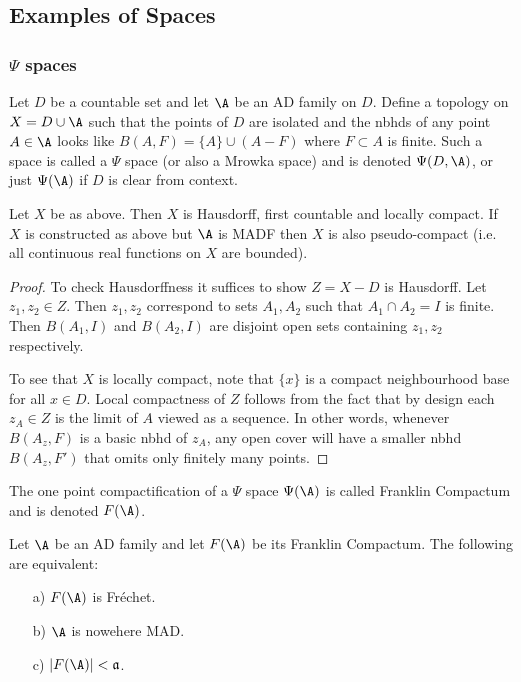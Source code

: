 \documentclass{article}
\begin{document}
\subsection{Examples of Spaces}

\subsubsection{\(\Psi\) spaces}

\begin{defn}
    Let \(D\) be a countable set and let \(\A\) be an AD family on \(D\). Define a topology on \(X = D \cup \A\) such that the points of \(D\) are isolated and the nbhds of any point \(A \in \A\) looks like \(B(A, F) = \{A\} \cup (A - F)\) where \(F \subset A\) is finite. Such a space is called a \(\Psi\) space (or also a Mrowka space) and is denoted \(\Psi(D, \A)\), or just \(\Psi(\A)\) if \(D\) is clear from context.
\end{defn}

\begin{prop}
    Let \(X\) be as above. Then \(X\) is Hausdorff, first countable and locally compact. If \(X\) is constructed as above but \(\A\) is MADF then \(X\) is also pseudo-compact (i.e. all continuous real functions on \(X\) are bounded).
\end{prop}

\begin{proof}
    To check Hausdorffness it suffices to show \(Z = X- D\) is Hausdorff. Let \(z_1, z_2 \in Z\). Then \(z_1, z_2\) correspond to sets \(A_1, A_2\) such that \(A_1 \cap A_2 = I\) is finite. Then \(B(A_1, I)\) and \(B(A_2, I)\) are disjoint open sets containing \(z_1, z_2\) respectively. 

    To see that \(X\) is locally compact, note that \(\{x\}\) is a compact neighbourhood base for all \(x \in D\). Local compactness of \(Z\) follows from the fact that by design each \(z_A \in Z\) is the limit of \(A\) viewed as a sequence. In other words, whenever \(B(A_z, F)\) is a basic nbhd of \(z_A\), any open cover will have a smaller nbhd \(B(A_z, F')\) that omits only finitely many points.
\end{proof}
The one point compactification of a \(\Psi\) space \(\Psi(\A)\) is called Franklin Compactum and is denoted \(F(\A)\).
\begin{prop}
    \label{prop: Franklin Compactum}
    Let \(\A\) be an AD family and let \(F(\A)\) be its Franklin Compactum. The following are equivalent:
    \begin{enumerate}
        \item[a)] \(F(\A)\) is Fréchet. 
        \item[b)] \(\A\) is nowehere MAD.
        \item[c)] \(|F(\A)| < \mathfrak{a}\).
    \end{enumerate}
\end{prop}
\end{document}
